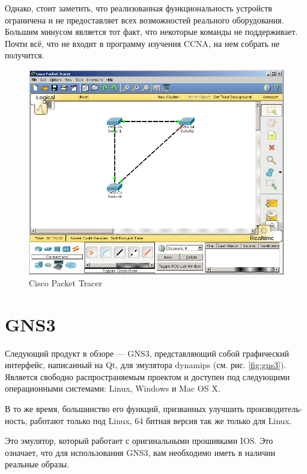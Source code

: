 \documentclass[a4paper,14pt]{extreport}
\begin{document}
	Однако, стоит заметить, что реализованная функциональность устройств
	ограничена и не предоставляет всех возможностей реального оборудования. Большим минусом является тот факт, что некоторые команды не
	поддерживает. Почти всё, что не входит в программу изучения CCNA, на нем собрать
	не получится.
	
	
	\begin{figure}[h]
		\centering
		\includegraphics[width=0.9\linewidth]{pic/packet_tracer}
		\caption{Cisco Packet Tracer}
		\label{fig:packet_tracer}
	\end{figure}
	
	\section{GNS3}
	
	
	Следующий продукт в обзоре — GNS3, представляющий собой графический интерфейс, написанный на Qt, для эмулятора dynamips (см. рис. \ref{fig:gns3}).
	Является свободно распространяемым проектом и доступен под следующими операционными системами: Linux, Windows и Mac OS X.
	
	В то же время, большинство его функций, призванных улучшить производитель-
	ность, работают только под Linux, 64 битная версия так же только для Linux.
	
	Это эмулятор, который работает с оригинальными прошивками IOS.
	Это означает, что для использования GNS3, вам необходимо иметь в наличии реальные образы.
	
\end{document}
